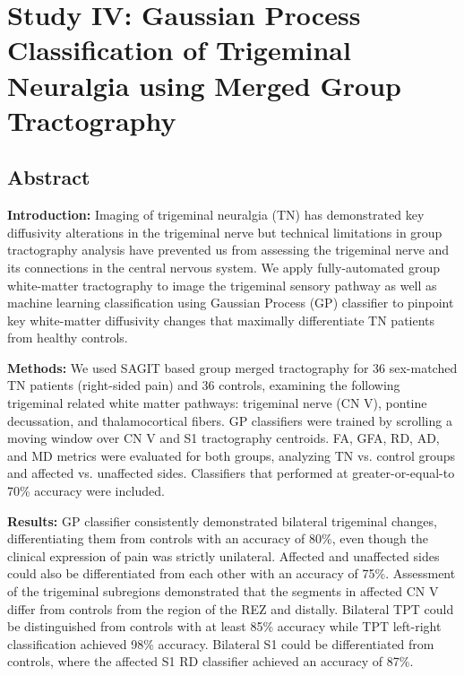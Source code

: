 \graphicspath{{images/tn-gp-sagit/drafts/}}

\chapter{Study IV: Gaussian Process Classification of Trigeminal Neuralgia using Merged Group Tractography}
\label{section:study4}

\section{Abstract}
\textbf{Introduction:}  Imaging of trigeminal neuralgia (TN) has demonstrated key diffusivity alterations in the trigeminal nerve but technical limitations in group tractography analysis have  prevented us from assessing the trigeminal nerve and its connections in the central nervous system. We apply fully-automated group white-matter tractography to image the trigeminal sensory pathway as well as machine learning classification using Gaussian Process (GP) classifier to pinpoint key white-matter diffusivity changes that maximally differentiate TN patients from healthy controls. 

\textbf{Methods:} We used SAGIT based group merged tractography for 36 sex-matched TN patients (right-sided pain) and 36 controls, examining the following trigeminal related white matter pathways: trigeminal nerve (CN V), pontine decussation, and thalamocortical fibers. GP classifiers were trained by scrolling a moving window over CN V and S1 tractography centroids. FA, GFA, RD, AD, and MD metrics were evaluated for both groups, analyzing TN vs. control groups and affected vs. unaffected sides. Classifiers that performed at greater-or-equal-to 70\% accuracy were included.

\textbf{Results:} GP classifier consistently demonstrated bilateral trigeminal changes, differentiating them from controls with an accuracy of 80\%, even though the clinical expression of pain was strictly unilateral. Affected and unaffected sides could also be differentiated from each other with an accuracy of 75\%. Assessment of the trigeminal subregions demonstrated that the segments in affected CN V differ from controls from the region of the REZ and distally. Bilateral TPT could be distinguished from controls with at least 85\% accuracy while TPT left-right classification achieved 98\% accuracy. Bilateral S1 could be differentiated from controls, where the affected S1 RD classifier achieved an accuracy of 87\%.

